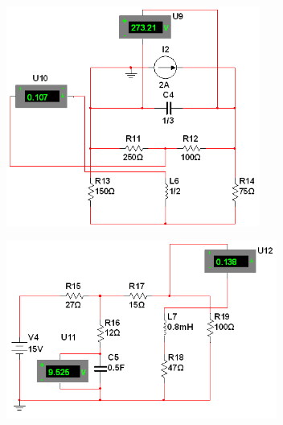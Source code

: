 \documentclass[10pt]{article}
\begin{document}
\begin{center}
	\includegraphics[width=8.32cm, height=7.22cm]{Imagenes/5.png}
\end{center}
\begin{center}
	\includegraphics[width=8.89cm, height=5.84cm]{Imagenes/6.png}
\end{center}
\end{document}
